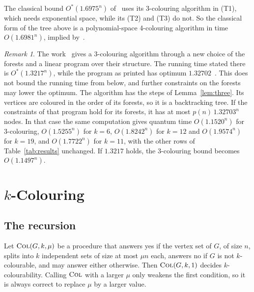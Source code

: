 \documentclass[11pt]{article}
\theoremstyle{remark}
\newtheorem{remark}[theorem]{Remark}
\newcommand{\COL}{\textup{\textsc{Col}}}
\begin{document}
The classical bound $O^*(1.6975^n)$ of~\cite{YS26} uses its 3-colouring algorithm in (T1), which needs exponential space, while its (T2) and (T3) do not. So the classical form of the tree above is a polynomial-space 4-colouring algorithm in time $O(1.6981^n)$, implied by~\cite{WGJ24,YS26}.

\begin{remark}\label{rem:mei}
The work~\cite{Mei23} gives a 3-colouring algorithm through a new choice of the forests and a linear program over their structure. The running time stated there is $O^*(1.3217^n)$, while the program as printed has optimum $1.32702$~\cite[Appendix~F]{YS26}. This does not bound the running time from below, and further constraints on the forests may lower the optimum. The algorithm has the steps of Lemma~\ref{lem:three}. Its vertices are coloured in the order of its forests, so it is a backtracking tree. If the constraints of that program hold for its forests, it has at most $p(n)\,1.32703^n$ nodes. In that case the same computation gives quantum time $O(1.1520^n)$ for 3-colouring, $O(1.5255^n)$ for $k = 6$, $O(1.8242^n)$ for $k = 12$ and $O(1.9574^n)$ for $k = 19$, and $O(1.7722^n)$ for $k = 11$, with the other rows of Table~\ref{tab:results} unchanged. If $1.3217$ holds, the 3-colouring bound becomes $O(1.1497^n)$.
\end{remark}

\section{\texorpdfstring{$k$}{k}-Colouring}

\subsection{The recursion}

Let $\COL(G, k, \mu)$ be a procedure that answers yes if the vertex set of $G$, of size $n$, splits into $k$ independent sets of size at most $\mu n$ each, answers no if $G$ is not $k$-colourable, and may answer either otherwise. Then $\COL(G, k, 1)$ decides $k$-colourability. Calling $\COL$ with a larger $\mu$ only weakens the first condition, so it is always correct to replace $\mu$ by a larger value.
\end{document}
